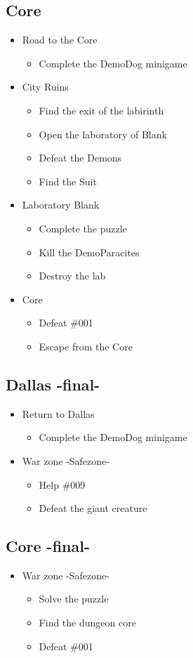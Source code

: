 \subsection{Core}
\begin{itemize}
		\item Road to the Core
		\begin{itemize}	
			\item Complete the DemoDog minigame
		\end{itemize}
	\item City Ruins
	\begin{itemize}
		\item Find the exit of the labirinth
		\item Open the laboratory of Blank
		\item Defeat the Demons
		\item Find the Suit
	\end{itemize}
	\item Laboratory Blank
	\begin{itemize}
		\item Complete the puzzle
		\item Kill the DemoParacites
		\item Destroy the lab
	\end{itemize}
	\item Core
	\begin{itemize}
		\item Defeat \#001
		\item Escape from the Core
	\end{itemize}
\end{itemize}

\subsection{Dallas -final-}
\begin{itemize}
		\item Return to Dallas
		\begin{itemize}	
			\item Complete the DemoDog minigame
		\end{itemize}
	\item War zone -Safezone-
	\begin{itemize}
	\item Help \#009
	\item Defeat the giant creature
	\end{itemize}
\end{itemize}
\subsection{Core -final-}
\begin{itemize}
	\item War zone -Safezone-
	\begin{itemize}
		\item Solve the puzzle
		\item Find the dungeon core
		\item Defeat \#001 
	\end{itemize}
\end{itemize}


